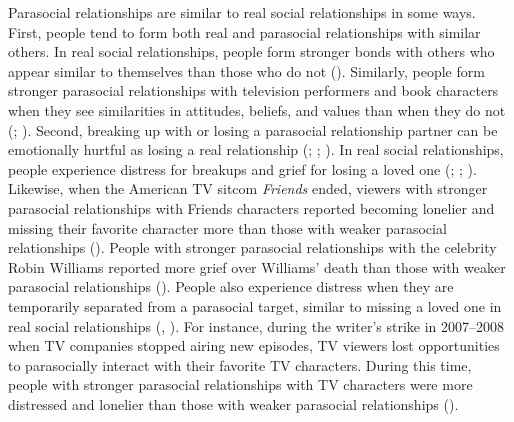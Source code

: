 \documentclass[
]{udthesis}
\begin{document}
Parasocial relationships are similar to real social relationships in
some ways. First, people tend to form both real and parasocial
relationships with similar others. In real social relationships, people
form stronger bonds with others who appear similar to themselves than
those who do not (). Similarly, people form stronger
parasocial relationships with television performers and book characters
when they see similarities in attitudes, beliefs, and values than when
they do not (; ). Second, breaking up with or
losing a parasocial relationship partner can be emotionally hurtful as
losing a real relationship (; ; ). In real
social relationships, people experience distress for breakups and grief
for losing a loved one (; ; ).
Likewise, when the American TV sitcom \emph{Friends} ended, viewers with
stronger parasocial relationships with Friends characters reported
becoming lonelier and missing their favorite character more than those
with weaker parasocial relationships (). People with stronger
parasocial relationships with the celebrity Robin Williams reported more
grief over Williams' death than those with weaker parasocial
relationships (). People also experience distress when they
are temporarily separated from a parasocial target, similar to missing a
loved one in real social relationships (, ). For instance,
during the writer's strike in 2007--2008 when TV companies stopped
airing new episodes, TV viewers lost opportunities to parasocially
interact with their favorite TV characters. During this time, people
with stronger parasocial relationships with TV characters were more
distressed and lonelier than those with weaker parasocial relationships
().
\end{document}
